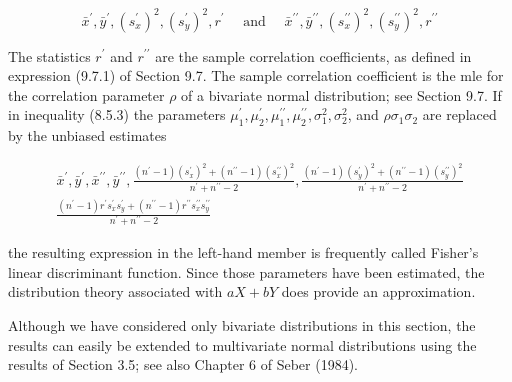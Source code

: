 $$
\bar{x}^{\prime}, \bar{y}^{\prime},\left(s_{x}^{\prime}\right)^{2},\left(s_{y}^{\prime}\right)^{2}, r^{\prime} \quad \text { and } \quad \bar{x}^{\prime \prime}, \bar{y}^{\prime \prime},\left(s_{x}^{\prime \prime}\right)^{2},\left(s_{y}^{\prime \prime}\right)^{2}, r^{\prime \prime}
$$

The statistics $r^{\prime}$ and $r^{\prime \prime}$ are the sample correlation coefficients, as defined in expression (9.7.1) of Section 9.7. The sample correlation coefficient is the mle for the correlation parameter $\rho$ of a bivariate normal distribution; see Section 9.7. If in inequality (8.5.3) the parameters $\mu_{1}^{\prime}, \mu_{2}^{\prime}, \mu_{1}^{\prime \prime}, \mu_{2}^{\prime \prime}, \sigma_{1}^{2}, \sigma_{2}^{2}$, and $\rho \sigma_{1} \sigma_{2}$ are replaced by the unbiased estimates

$$
\begin{gathered}
\bar{x}^{\prime}, \bar{y}^{\prime}, \bar{x}^{\prime \prime}, \bar{y}^{\prime \prime}, \frac{\left(n^{\prime}-1\right)\left(s_{x}^{\prime}\right)^{2}+\left(n^{\prime \prime}-1\right)\left(s_{x}^{\prime \prime}\right)^{2}}{n^{\prime}+n^{\prime \prime}-2}, \frac{\left(n^{\prime}-1\right)\left(s_{y}^{\prime}\right)^{2}+\left(n^{\prime \prime}-1\right)\left(s_{y}^{\prime \prime}\right)^{2}}{n^{\prime}+n^{\prime \prime}-2} \\
\frac{\left(n^{\prime}-1\right) r^{\prime} s_{x}^{\prime} s_{y}^{\prime}+\left(n^{\prime \prime}-1\right) r^{\prime \prime} s_{x}^{\prime \prime} s_{y}^{\prime \prime}}{n^{\prime}+n^{\prime \prime}-2}
\end{gathered}
$$

the resulting expression in the left-hand member is frequently called Fisher's linear discriminant function. Since those parameters have been estimated, the distribution theory associated with $a X+b Y$ does provide an approximation.

Although we have considered only bivariate distributions in this section, the results can easily be extended to multivariate normal distributions using the results of Section 3.5; see also Chapter 6 of Seber (1984).

